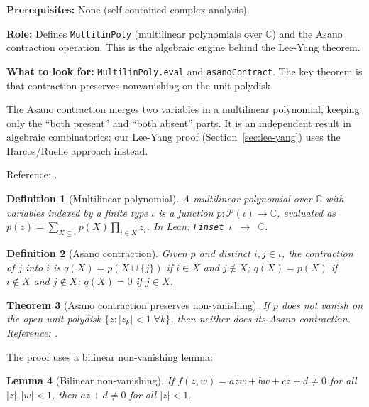 \documentclass[a4paper,11pt]{article}
\newtheorem{theorem}{Theorem}
\newtheorem{lemma}[theorem]{Lemma}
\newtheorem{definition}[theorem]{Definition}
\begin{document}
\par\noindent\textbf{Prerequisites:} None (self-contained complex analysis).

\textbf{Role:} Defines \texttt{MultilinPoly} (multilinear polynomials
over $\mathbb{C}$) and the Asano contraction operation. This is the
algebraic engine behind the Lee-Yang theorem.

\textbf{What to look for:} \texttt{MultilinPoly.eval} and
\texttt{asanoContract}. The key theorem is that contraction
preserves nonvanishing on the unit polydisk.

The Asano contraction merges two variables in a multilinear polynomial,
keeping only the ``both present'' and ``both absent'' parts.
It is an independent result in algebraic combinatorics; our Lee-Yang proof
(Section~\ref{sec:lee-yang}) uses the Harcos/Ruelle approach instead.

Reference: \cite[Proposition~3.44, pp.~123--124]{friedli-velenik}.

\begin{definition}[Multilinear polynomial]
A multilinear polynomial over $\mathbb{C}$ with variables indexed by a
finite type $\iota$ is a function $p : \mathcal{P}(\iota) \to \mathbb{C}$,
evaluated as $p(z) = \sum_{X \subseteq \iota} p(X) \prod_{i \in X} z_i$.
In Lean: \texttt{Finset $\iota$ $\to$ $\mathbb{C}$}.
\end{definition}

\begin{definition}[Asano contraction]
Given $p$ and distinct $i, j \in \iota$, the contraction of $j$ into $i$
is $q(X) = p(X \cup \{j\})$ if $i \in X$ and $j \notin X$;
$q(X) = p(X)$ if $i \notin X$ and $j \notin X$;
$q(X) = 0$ if $j \in X$.
\end{definition}

\begin{theorem}[Asano contraction preserves non-vanishing]
\label{thm:asano}
If $p$ does not vanish on the open unit polydisk
$\{z : |z_k| < 1\;\forall k\}$, then neither does its Asano contraction.
Reference: \cite[Proposition~3.44, pp.~123--124]{friedli-velenik}.
\end{theorem}

The proof uses a bilinear non-vanishing lemma:

\begin{lemma}[Bilinear non-vanishing]
If $f(z,w) = azw + bw + cz + d \neq 0$ for all $|z|, |w| < 1$,
then $az + d \neq 0$ for all $|z| < 1$.
\end{lemma}
\end{document}
